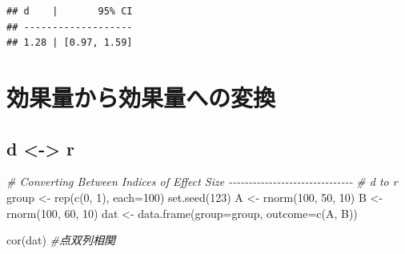 \documentclass[
  ja=standard, xelatex, base=12pt]{bxjsreport}
\newenvironment{Shaded}{\begin{snugshade}}{\end{snugshade}}
\newcommand{\AttributeTok}[1]{\textcolor[rgb]{0.77,0.63,0.00}{#1}}
\newcommand{\CommentTok}[1]{\textcolor[rgb]{0.56,0.35,0.01}{\textit{#1}}}
\newcommand{\DecValTok}[1]{\textcolor[rgb]{0.00,0.00,0.81}{#1}}
\newcommand{\FunctionTok}[1]{\textcolor[rgb]{0.00,0.00,0.00}{#1}}
\newcommand{\NormalTok}[1]{#1}
\newcommand{\OtherTok}[1]{\textcolor[rgb]{0.56,0.35,0.01}{#1}}
\newcommand{\SpecialCharTok}[1]{\textcolor[rgb]{0.00,0.00,0.00}{#1}}
\begin{document}
\begin{Shaded}
\end{Shaded}

\begin{verbatim}
## d    |       95% CI
## -------------------
## 1.28 | [0.97, 1.59]
\end{verbatim}

\begin{Shaded}
\end{Shaded}

\hypertarget{ux52b9ux679cux91cfux304bux3089ux52b9ux679cux91cfux3078ux306eux5909ux63db}{%
\section{効果量から効果量への変換}\label{ux52b9ux679cux91cfux304bux3089ux52b9ux679cux91cfux3078ux306eux5909ux63db}}

\hypertarget{d---r}{%
\subsection{d \textless-\textgreater{} r}\label{d---r}}

\begin{Shaded}
\begin{Highlighting}[]
\CommentTok{\# Converting Between Indices of Effect Size {-}{-}{-}{-}{-}{-}{-}{-}{-}{-}{-}{-}{-}{-}{-}{-}{-}{-}{-}{-}{-}{-}{-}{-}{-}{-}{-}{-}{-}{-}{-}}
\CommentTok{\# d to r}
\NormalTok{group }\OtherTok{\textless{}{-}} \FunctionTok{rep}\NormalTok{(}\FunctionTok{c}\NormalTok{(}\DecValTok{0}\NormalTok{, }\DecValTok{1}\NormalTok{), }\AttributeTok{each=}\DecValTok{100}\NormalTok{)}
\FunctionTok{set.seed}\NormalTok{(}\DecValTok{123}\NormalTok{)}
\NormalTok{A }\OtherTok{\textless{}{-}} \FunctionTok{rnorm}\NormalTok{(}\DecValTok{100}\NormalTok{, }\DecValTok{50}\NormalTok{, }\DecValTok{10}\NormalTok{)}
\NormalTok{B }\OtherTok{\textless{}{-}} \FunctionTok{rnorm}\NormalTok{(}\DecValTok{100}\NormalTok{, }\DecValTok{60}\NormalTok{, }\DecValTok{10}\NormalTok{)}
\NormalTok{dat }\OtherTok{\textless{}{-}} \FunctionTok{data.frame}\NormalTok{(}\AttributeTok{group=}\NormalTok{group, }\AttributeTok{outcome=}\FunctionTok{c}\NormalTok{(A, B))}

\FunctionTok{cor}\NormalTok{(dat) }\CommentTok{\#点双列相関}
\end{Highlighting}
\end{Shaded}
\end{document}
